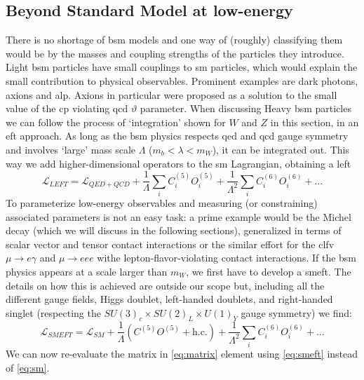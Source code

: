 \begin{refsection}
    \subsection{Beyond Standard Model at low-energy}
        There is no shortage of \gls{bsm} models and one way of (roughly) classifying them would be by the masses and coupling strengths of the particles they introduce. 
        Light \gls{bsm} particles have small couplings to \gls{sm} particles, which would explain the small contribution to physical observables. Prominent examples are dark photons, axions and \gls{alp}.
        Axions in particular were proposed as a solution to the small value of the \gls{cp} violating \gls{qcd} $\vartheta$ parameter.
        When discussing Heavy \gls{bsm} particles we can follow the process of `integration' shown for $W$ and $Z$ in this section, in an \gls{eft} approach.
        As long as the \gls{bsm} physics respects \gls{qed} and \gls{qcd} gauge symmetry and involves `large' mass scale $\Lambda$ ($m_b<\lambda<m_W$), it can be integrated out. 
        This way we add higher-dimensional operators to the \gls{sm} Lagrangian, obtaining a \gls{left}
        \begin{equation}
            \mathcal{L}_{LEFT}= \mathcal{L}_{QED+QCD}+\frac{1}{\Lambda}\sum_iC^{(5)}_iO^{(5)}_i +\frac{1}{\Lambda^2}\sum_iC^{(6)}_iO^{(6)}_i +\dots
                \label{eq:left}
        \end{equation}
        To parameterize low-energy observables and measuring (or constraining) associated parameters is not an easy task: a prime example would be the Michel decay (which we will discuss in the following sections), generalized in terms of scalar vector and tensor contact interactions or the similar effort for the \gls{clfv} $\mu\rightarrow e \gamma$ and $\mu \rightarrow eee$ withe lepton-flavor-violating contact interactions.
        If the \gls{bsm} physics appears at a scale larger than $m_W$, we first have to develop a \gls{smeft}.
        The details on how this is achieved are outside our scope but, including all the different gauge fields, Higgs doublet, left-handed doublets, and right-handed singlet (respecting the $SU(3)_c\times SU(2)_L\times U(1)_Y$ gauge symmetry) we find:
        \begin{equation}
            \mathcal{L}_{SMEFT}=\mathcal{L}_{SM}+\frac{1}{\Lambda}(C^{(5)}O^{(5)}+\text{h.c.}) +\frac{1}{\Lambda^2}\sum_iC^{(6)}_iO^{(6)}_i +\dots
            \label{eq:smeft}
        \end{equation}
        We can now re-evaluate the matrix in \ref{eq:matrix} element using \ref{eq:smeft} instead of \ref{eq:sm}.

\end{refsection}
